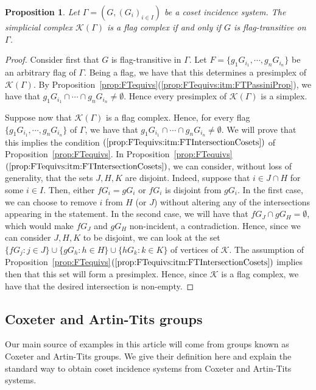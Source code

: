 \documentclass[11pt,letterpaper]{amsart}
\newtheorem{prop}{Proposition}[section]
\newcommand{\KK}{\mathcal{K}}
\begin{document}
\begin{prop}\label{prop:FComp:equiv:FT}
    Let $\Gamma=(G,(G_i)_{i\in I})$ be a coset incidence system. The simplicial complex $\KK(\Gamma)$ is a flag complex if and only if $G$ is flag-transitive on $\Gamma$.
\end{prop}
\begin{proof}
    Consider first that $G$ is flag-transitive in $\Gamma$.
    Let $F=\{g_1 G_{i_1}, \cdots, g_n G_{i_n} \}$ be an arbitrary flag of $\Gamma$. Being a flag, we have that this determines a presimplex of $\KK(\Gamma)$.
    By Proposition~\ref{prop:FTequivs}(\ref{prop:FTequivs:itm:FTPassiniProp}), we have that 
    $g_1 G_{i_1} \cap \cdots \cap g_n G_{i_n} \neq \emptyset$. Hence every presimplex of $\KK(\Gamma)$ is a simplex.
    
    Suppose now that $\KK(\Gamma)$ is a flag complex. Hence, for every flag $\{g_1 G_{i_1}, \cdots, g_n G_{i_n} \}$ of $\Gamma$, we have that $g_1 G_{i_1} \cap \cdots \cap g_n G_{i_n} \neq \emptyset$.
    We will prove that this implies the condition $(\ref{prop:FTequivs:itm:FTIntersectionCosets})$ of Proposition~\ref{prop:FTequivs}. In Proposition~\ref{prop:FTequivs}$(\ref{prop:FTequivs:itm:FTIntersectionCosets})$, we can consider, without loss of generality, that the sets $J,H,K$ are disjoint. Indeed, suppose that $i \in J \cap H$ for some $i \in I$. Then, either $fG_i = gG_i$ or $fG_i$ is disjoint from $gG_i$. In the first case, we can choose to remove $i$ from $H$ (or $J$) without altering any of the intersections appearing in the statement. In the second case, we will have that $fG_J \cap gG_H = \emptyset$, which would make $fG_J$ and $gG_H$ non-incident, a contradiction. Hence, since we can consider $J,H,K$ to be disjoint, we can look at the set $\{f G_j : j \in J\} \cup \{g G_h : h \in H\} \cup\{h G_k : k \in K \} $ of vertices of $\mathcal{K}$. The assumption of Proposition~\ref{prop:FTequivs}$(\ref{prop:FTequivs:itm:FTIntersectionCosets})$ implies then that this set will form a presimplex. Hence, since $\mathcal{K}$ is a flag complex, we have that the desired intersection is non-empty.
\end{proof}




\subsection{Coxeter and Artin-Tits groups}\label{sec:back:subsec:CoxArtGroupComplex}

Our main source of examples in this article will come from groups known as Coxeter and Artin-Tits groups. We give their definition here and explain the standard way to obtain coset incidence systems from Coxeter and Artin-Tits systems.
\end{document}
